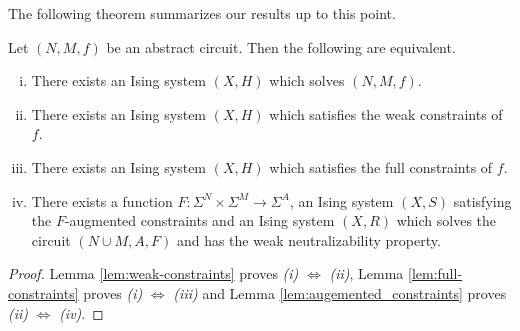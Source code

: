 \documentclass{article}
\begin{document}
\bigskip

The following theorem summarizes our results up to this point.
\begin{thm}\label{thm:ising-solve-equivalences}
  Let $(N, M, f)$ be an abstract circuit. Then the following are equivalent.
  \begin{enumerate}[(i)]
    \item There exists an Ising system $(X, H)$ which solves $(N,M,f)$.
    \item There exists an Ising system $(X,H)$ which satisfies the weak constraints of $f$.
    \item There exists an Ising system $(X,H)$ which satisfies the full constraints of $f$.
    \item There exists a function $F: \Sigma^N \times \Sigma^M\to \Sigma^A$, an Ising system $(X,S)$ satisfying the $F$-augmented constraints and an Ising system $(X, R)$ which solves the circuit $(N\cup M, A, F)$ and has the weak neutralizability property.
  \end{enumerate}
\end{thm}
\begin{proof}
  Lemma \ref{lem:weak-constraints} proves \emph{(i)} $\Leftrightarrow$ \emph{(ii)}, Lemma \ref{lem:full-constraints} proves \emph{(i)} $\Leftrightarrow$ \emph{(iii)} and Lemma \ref{lem:augemented_constraints} proves \emph{(ii)} $\Leftrightarrow$ \emph{(iv)}.
\end{proof}
\end{document}
